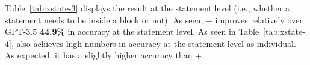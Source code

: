 
Table~\ref{tab:xstate-3} displays the result at the statement level
(i.e., whether a statement needs to be inside a  block
or not). As seen, {\xblock}+{\xstate} improves relatively over GPT-3.5
{\bf 44.9\%}
in accuracy at the statement level.
%
As seen in Table~\ref{tab:xstate-4}, {\tool} also achieves high
numbers in accuracy at the statement level as individual.
As expected, it has a slightly higher accuracy than \xblock+\xstate.

